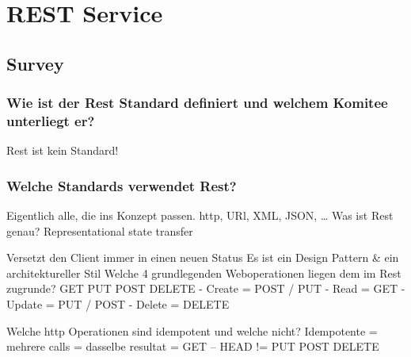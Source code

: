 \chapter{REST Service}

\section{Survey}

\subsection{Wie ist der Rest Standard definiert und welchem Komitee unterliegt er?}

Rest ist kein Standard!


\subsection{Welche Standards verwendet Rest?}

Eigentlich alle, die ins Konzept passen.
http, URl, XML, JSON, …
Was ist Rest genau?
Representational state transfer

Versetzt den Client immer in einen neuen Status
Es ist ein Design Pattern \& ein architektureller Stil
Welche 4 grundlegenden Weboperationen liegen dem im Rest zugrunde?
GET PUT POST DELETE
-	Create = POST / PUT
-	Read = GET
-	Update = PUT / POST
-	Delete = DELETE

Welche http Operationen sind idempotent und welche nicht?
Idempotente = mehrere calls = dasselbe resultat
= GET – HEAD 
!= PUT POST DELETE




